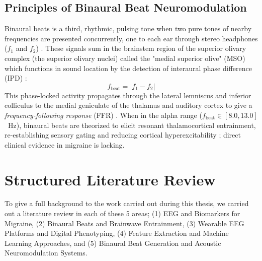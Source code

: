 \documentclass[12pt, a4paper]{report}
\begin{document}
\subsection{Principles of Binaural Beat Neuromodulation}
\label{sec:binaural_principles}
Binaural beats is a third, rhythmic, pulsing tone when two pure tones of nearby frequencies are presented concurrently, one to each ear through stereo headphones ($f_1$ and $f_2$)  \cite{Oster1973}. These signals sum in the brainstem region of the superior olivary complex (the superior olivary nuclei) called the "medial superior olive" (MSO) which functions in sound location by the detection of interaural phase difference (IPD) \cite{Wahbeh2007}:
\begin{equation}
    f_{\text{beat}} = |f_1 - f_2|
    \label{eq:binaural_beat_freq}
\end{equation}
This phase-locked activity propagates through the lateral lemniscus and inferior colliculus to the medial geniculate of the thalamus and auditory cortex to give a \textit{frequency-following response} (FFR) \cite{Ingendoh2023,Shamsi2024}. When in the alpha range ($f_\text{beat}\in [8.0,13.0]$~Hz), binaural beats are theorized to elicit resonant thalamocortical entrainment, re-establishing sensory gating and reducing cortical hyperexcitability \cite{CoronaGonzalez2021,Melnichuk2025,battu2025longterm}; direct clinical evidence in migraine is lacking.

\section{Structured Literature Review}
\label{sec:literature_review}
To give a full background to the work carried out during this thesis, we carried out a literature review in each of these 5 areas; (1) EEG and Biomarkers for Migraine, (2) Binaural Beats and Brainwave Entrainment, (3) Wearable EEG Platforms and Digital Phenotyping, (4) Feature Extraction and Machine Learning Approaches, and (5) Binaural Beat Generation and Acoustic Neuromodulation Systems.
\end{document}
